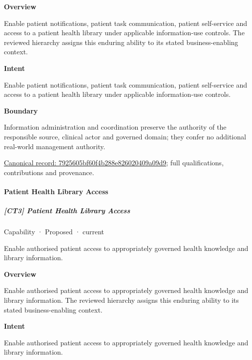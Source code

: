 \textbf{Overview}



Enable patient notifications, patient task communication, patient self-service and access to a patient health library under applicable information-use controls. The reviewed hierarchy assigns this enduring ability to its stated business-enabling context.



\textbf{Intent}



Enable patient notifications, patient task communication, patient self-service and access to a patient health library under applicable information-use controls.



\textbf{Boundary}



Information administration and coordination preserve the authority of the responsible source, clinical actor and governed domain; they confer no additional real-world management authority.


{\footnotesize \href{../../../../continuum/strategy/capability/7925605bf60f4b288e826020409a09d9.md}{Canonical record: 7925605bf60f4b288e826020409a09d9}; full qualifications, contributions and provenance.}\par
\paragraph{Patient Health Library Access}

\subparagraph{[CT3] Patient Health Library Access}

\label{element:808e5a3c3f6b496fa329962088f0bee0}
{\small Capability · Proposed · current}\par

Enable authorised patient access to appropriately governed health knowledge and library information.



\textbf{Overview}



Enable authorised patient access to appropriately governed health knowledge and library information. The reviewed hierarchy assigns this enduring ability to its stated business-enabling context.



\textbf{Intent}



Enable authorised patient access to appropriately governed health knowledge and library information.



